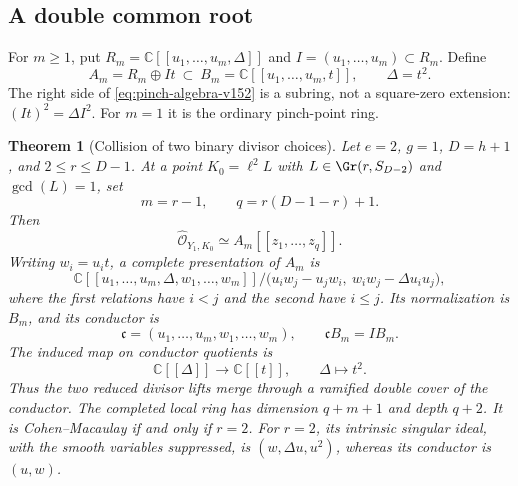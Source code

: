 \documentclass[11pt,reqno]{amsart}
\numberwithin{equation}{section}
\newtheorem{theorem}{Theorem}[section]
\theoremstyle{definition}\newtheorem{definition}[theorem]{Definition}
\theoremstyle{remark}\newtheorem{remark}[theorem]{Remark}
\newcommand{\C}{\mathbb C}\newcommand{\Q}{\mathbb Q}
\newcommand{\OO}{\mathcal O}\newcommand{\II}{\mathcal I}
\begin{document}
\subsection{A double common root}
For $m\geq1$, put $R_m=\C[[u_1,\ldots,u_m,\Delta]]$ and
$I=(u_1,\ldots,u_m)\subset R_m$.  Define
\begin{equation}\label{eq:pinch-algebra-v152}
 A_m=R_m\oplus I t\ \subset\ B_m=\C[[u_1,\ldots,u_m,t]],
                    \qquad \Delta=t^2.
\end{equation}
The right side of \eqref{eq:pinch-algebra-v152} is a subring,
not a square-zero extension: $(It)^2=\Delta I^2$.  For $m=1$
it is the ordinary pinch-point ring.

\begin{theorem}[Collision of two binary divisor choices]
\label{thm:binary-pinch-v152}
Let $e=2$, $g=1$, $D=h+1$, and $2\leq r\leq D-1$.
At a point $K_0=\ell^2 L$ with
$L\in\Gr(r,S_{D-2})$ and $\gcd(L)=1$, set
\[
             m=r-1,\qquad q=r(D-1-r)+1.
\]
Then
\begin{equation}\label{eq:binary-completion-v152}
              \widehat{\OO}_{Y_1,K_0}\simeq A_m[[z_1,\ldots,z_q]].
\end{equation}
Writing $w_i=u_i t$, a complete presentation of $A_m$ is
\begin{equation}\label{eq:pinch-equations-v152}
 \C[[u_1,\ldots,u_m,\Delta,w_1,\ldots,w_m]]/
 \bigl(u_iw_j-u_jw_i,\ w_iw_j-\Delta u_i u_j\bigr),
\end{equation}
where the first relations have $i<j$ and the second have $i\leq j$.
Its normalization is $B_m$, and its conductor is
\[
 \mathfrak c=(u_1,\ldots,u_m,w_1,\ldots,w_m),\qquad
 \mathfrak c B_m=I B_m.
\]
The induced map on conductor quotients is
\begin{equation}\label{eq:conductor-cover-v152}
              \C[[\Delta]]\longrightarrow\C[[t]],\qquad\Delta\longmapsto t^2.
\end{equation}
Thus the two reduced divisor lifts merge through a ramified double
cover of the conductor.  The completed local ring has dimension
$q+m+1$ and depth $q+2$.  It is Cohen--Macaulay if and only if $r=2$.
For $r=2$, its intrinsic singular ideal, with the smooth variables
suppressed, is $(w,\Delta u,u^2)$, whereas its conductor is $(u,w)$.
\end{theorem}
\end{document}
